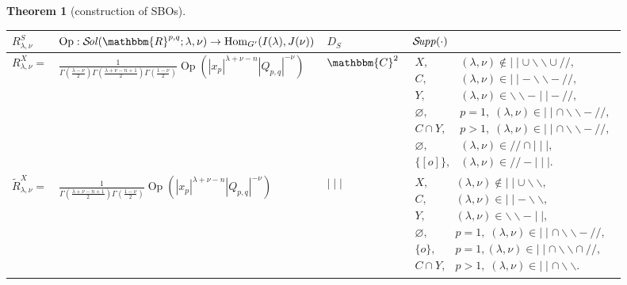 \documentclass[12pt]{article} %
\newcommand{\nin}{\not\in}
\newcommand{\tmop}[1]{\ensuremath{\operatorname{#1}}}
\newtheorem{theorem}{Theorem}
\newcommand{\Sol}{\mathcal{S}\!{\it ol}}
\newcommand{\Supp}{\mathcal{S}\!{\it upp}}
\theoremstyle{definition}
\theoremstyle{exampstyle} \newtheorem{examp}[theorem]{Theorem}
\renewcommand{\Q}{Q_{p,q}}
\begin{document}
\begin{theorem}[construction of SBOs]
\hspace{-2.0cm}\begin{tabular}{@{}|@{}l@{}|@{}l@{}|l@{}|@{}l@{}|}
  \hline
  $R_{\lambda,\nu}^S$& $\tmop{Op} : 
  \Sol(\mathbbm{R}^{p, q} ; \lambda, \nu)
  \rightarrow \tmop{Hom}_{G'} (I (\lambda), J (\nu))$ & $D_S\,$ &
  $\,{\Supp} (\cdot)$\\
  \hline
  $R_{\lambda, \nu}^X =$ & $ \frac{1}{\Gamma \left( \frac{\lambda - \nu}{2} \right) \Gamma \left(
  \frac{\lambda + \nu - n + 1}{2} \right) \Gamma \left( \frac{1 - \nu}{2}
  \right)}{\tmop{Op} \left(| x_p |^{\lambda + \nu - n}
  | \Q |^{- \nu} \right)}$ & $\mathbbm{C}^2$ & $\left.
  \begin{array}{ll}
    X, & (\lambda, \nu) \nin \mid \mid \cup \backslash\backslash \cup / /,\\
    C, & (\lambda, \nu) \in \mid \mid -\backslash\backslash - / /,\\
    Y, & (\lambda, \nu) \in \backslash\backslash - \mid \mid - / /,\\
    \varnothing, & p = 1, \; (\lambda, \nu) \in \mid \mid \cap
    \backslash\backslash - / /,\\
    C \cap Y, & p > 1, \; (\lambda, \nu) \in \mid \mid \cap
    \backslash\backslash - / /,\\
    \varnothing, & (\lambda, \nu) \in / / \cap \mid \mid \mid,\\
    \{ [o] \}, & (\lambda, \nu) \in / / - \mid \mid \mid\!.
  \end{array} \right.$\\
  \hline
  $\tilde{R}^X_{\lambda, \nu} =$ & $\frac{1}{\Gamma \left( \frac{\lambda + \nu - n + 1}{2}
  \right) \Gamma \left( \frac{1 - \nu}{2} \right)}{\tmop{Op} \left( | x_p |^{\lambda +
  \nu - n} | \Q |^{- \nu}\right)} $ & $
   \mid \mid \mid$ &
$\left. \begin{array}{ll}
  X, & (\lambda, \nu) \nin \mid \mid \cup \backslash\backslash,\\
  C, & (\lambda, \nu) \in \mid \mid -\backslash\backslash,\\
  Y, & (\lambda, \nu) \in \backslash\backslash - \mid \mid,\\
  \varnothing, & p = 1, \; (\lambda, \nu) \in \mid \mid \cap
  \backslash\backslash - / /,\\
  \{ o \}, & p = 1, (\lambda, \nu) \in \mid \mid \cap \backslash\backslash
  \cap / /,\\
  C \cap Y, & p > 1, \; (\lambda, \nu) \in \mid \mid \cap \backslash\backslash
  .
\end{array} \right.$\\

\end{tabular}
\end{theorem}
\end{document}
